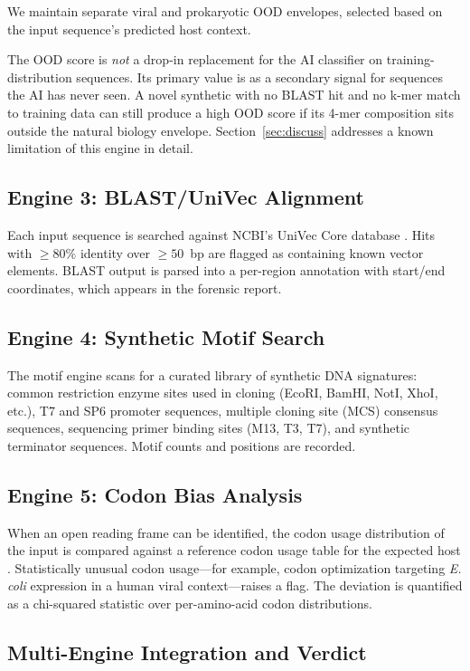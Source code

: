 \documentclass[conference]{IEEEtran}
\begin{document}
We maintain separate viral and prokaryotic OOD envelopes, selected based on the input sequence's predicted host context.

The OOD score is \emph{not} a drop-in replacement for the AI classifier on training-distribution sequences. Its primary value is as a secondary signal for sequences the AI has never seen. A novel synthetic with no BLAST hit and no k-mer match to training data can still produce a high OOD score if its 4-mer composition sits outside the natural biology envelope. Section~\ref{sec:discuss} addresses a known limitation of this engine in detail.

\subsection{Engine 3: BLAST/UniVec Alignment}

Each input sequence is searched against NCBI's UniVec Core database \cite{univec}. Hits with $\geq 80\%$ identity over $\geq 50$~bp are flagged as containing known vector elements. BLAST output is parsed into a per-region annotation with start/end coordinates, which appears in the forensic report.

\subsection{Engine 4: Synthetic Motif Search}

The motif engine scans for a curated library of synthetic DNA signatures: common restriction enzyme sites used in cloning (EcoRI, BamHI, NotI, XhoI, etc.), T7 and SP6 promoter sequences, multiple cloning site (MCS) consensus sequences, sequencing primer binding sites (M13, T3, T7), and synthetic terminator sequences. Motif counts and positions are recorded.

\subsection{Engine 5: Codon Bias Analysis}

When an open reading frame can be identified, the codon usage distribution of the input is compared against a reference codon usage table for the expected host \cite{kazusa}. Statistically unusual codon usage---for example, codon optimization targeting \textit{E. coli} expression in a human viral context---raises a flag. The deviation is quantified as a chi-squared statistic over per-amino-acid codon distributions.

\subsection{Multi-Engine Integration and Verdict}
\end{document}
